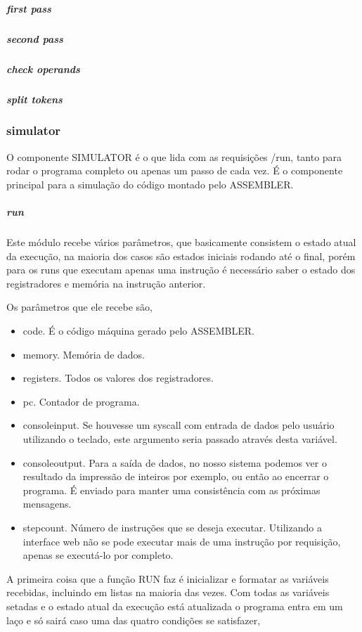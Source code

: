 			\subparagraph{first pass}						
				


			\subparagraph{second pass}
			
			\subparagraph{check operands}
			
			\subparagraph{split tokens}

		\subsubsection{simulator}

			O componente SIMULATOR é o que lida com as requisições /run, tanto para rodar o programa completo ou apenas um passo de cada vez. É o componente principal para a simulação do código montado pelo ASSEMBLER.

				\subparagraph{run}

					Este módulo recebe vários parâmetros, que basicamente consistem o estado atual da execução, na maioria dos casos são estados iniciais rodando até o final, porém para os runs que executam apenas uma instrução é necessário saber o estado dos registradores e memória na instrução anterior.

					Os parâmetros que ele recebe são, 
					\begin{itemize} 
						\item code. É o código máquina gerado pelo ASSEMBLER.
						\item memory. Memória de dados.
						\item registers. Todos os valores dos registradores.
						\item pc. Contador de programa.
						\item console\textunderscore input. Se houvesse um syscall com entrada de dados pelo usuário utilizando o teclado, este argumento seria passado através desta variável. 
						\item console\textunderscore  output. Para a saída de dados, no nosso sistema podemos ver o resultado da impressão de inteiros por exemplo, ou então ao encerrar o programa. É enviado para manter uma consistência com as próximas mensagens.
						\item step\textunderscore count. Número de instruções que se deseja executar. Utilizando a interface web não se pode executar mais de uma instrução por requisição, apenas se executá-lo por completo.
					\end{itemize}

					A primeira coisa que a função RUN faz é inicializar e formatar as variáveis recebidas, incluindo em listas na maioria das vezes. Com todas as variáveis setadas e o estado atual da execução está atualizada o programa entra em um laço e só sairá caso uma das quatro condições se satisfazer,

